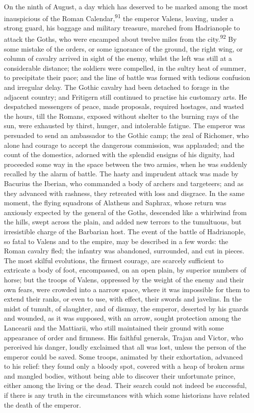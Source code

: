 On the ninth of August, a day which has deserved to be marked
among the most inauspicious of the Roman Calendar,\textsuperscript{91} the emperor
Valens, leaving, under a strong guard, his baggage and military
treasure, marched from Hadrianople to attack the Goths, who were
encamped about twelve miles from the city.\textsuperscript{92} By some mistake of
the orders, or some ignorance of the ground, the right wing, or
column of cavalry arrived in sight of the enemy, whilst the left
was still at a considerable distance; the soldiers were
compelled, in the sultry heat of summer, to precipitate their
pace; and the line of battle was formed with tedious confusion
and irregular delay. The Gothic cavalry had been detached to
forage in the adjacent country; and Fritigern still continued to
practise his customary arts. He despatched messengers of peace,
made proposals, required hostages, and wasted the hours, till the
Romans, exposed without shelter to the burning rays of the sun,
were exhausted by thirst, hunger, and intolerable fatigue. The
emperor was persuaded to send an ambassador to the Gothic camp;
the zeal of Richomer, who alone had courage to accept the
dangerous commission, was applauded; and the count of the
domestics, adorned with the splendid ensigns of his dignity, had
proceeded some way in the space between the two armies, when he
was suddenly recalled by the alarm of battle. The hasty and
imprudent attack was made by Bacurius the Iberian, who commanded
a body of archers and targeteers; and as they advanced with
rashness, they retreated with loss and disgrace. In the same
moment, the flying squadrons of Alatheus and Saphrax, whose
return was anxiously expected by the general of the Goths,
descended like a whirlwind from the hills, swept across the
plain, and added new terrors to the tumultuous, but irresistible
charge of the Barbarian host. The event of the battle of
Hadrianople, so fatal to Valens and to the empire, may be
described in a few words: the Roman cavalry fled; the infantry
was abandoned, surrounded, and cut in pieces. The most skilful
evolutions, the firmest courage, are scarcely sufficient to
extricate a body of foot, encompassed, on an open plain, by
superior numbers of horse; but the troops of Valens, oppressed by
the weight of the enemy and their own fears, were crowded into a
narrow space, where it was impossible for them to extend their
ranks, or even to use, with effect, their swords and javelins. In
the midst of tumult, of slaughter, and of dismay, the emperor,
deserted by his guards and wounded, as it was supposed, with an
arrow, sought protection among the Lancearii and the Mattiarii,
who still maintained their ground with some appearance of order
and firmness. His faithful generals, Trajan and Victor, who
perceived his danger, loudly exclaimed that all was lost, unless
the person of the emperor could be saved. Some troops, animated
by their exhortation, advanced to his relief: they found only a
bloody spot, covered with a heap of broken arms and mangled
bodies, without being able to discover their unfortunate prince,
either among the living or the dead. Their search could not
indeed be successful, if there is any truth in the circumstances
with which some historians have related the death of the emperor.

